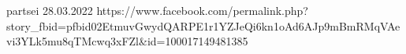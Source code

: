  
 
 
 
 

partsei 28.03.2022
https://www.facebook.com/permalink.php?story_fbid=pfbid02EtmuvGwydQARPE1r1YZJeQi6kn1oAd6AJp9mBmRMqVAevi3YLk5mu8qTMcwq3xFZl&id=100017149481385

